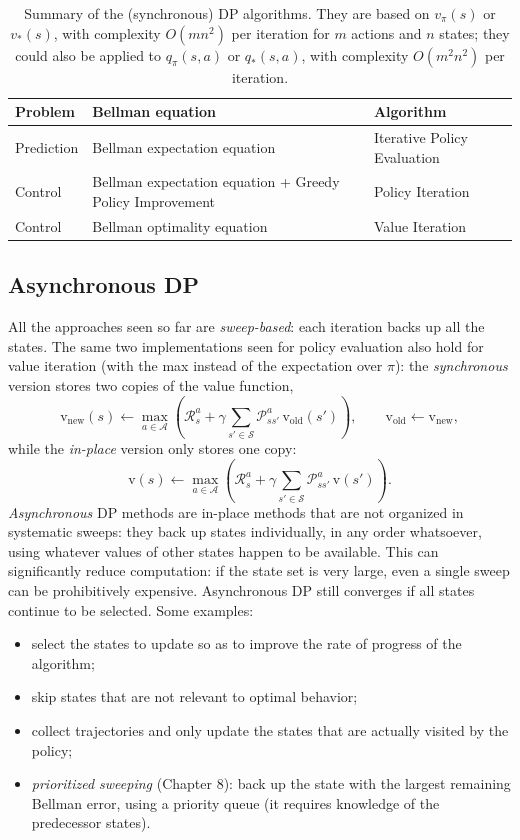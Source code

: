 \begin{table}[H]
\centering
\begin{tabular}{@{}l p{5.5cm} l@{}}
\toprule
\textbf{Problem} & \textbf{Bellman equation} & \textbf{Algorithm} \\
\midrule
Prediction & Bellman expectation equation & Iterative Policy Evaluation \\
Control    & Bellman expectation equation + Greedy Policy Improvement & Policy Iteration \\
Control    & Bellman optimality equation & Value Iteration \\
\bottomrule
\end{tabular}
\caption{Summary of the (synchronous) DP algorithms. They are based on $v_\pi(s)$ or $v_*(s)$, with complexity $O(mn^2)$ per iteration for $m$ actions and $n$ states; they could also be applied to $q_\pi(s,a)$ or $q_*(s,a)$, with complexity $O(m^2n^2)$ per iteration.}
\label{tab:dp-summary}
\end{table}

\subsection{Asynchronous DP}
All the approaches seen so far are \emph{sweep-based}: each iteration backs up all the states. The same two implementations seen for policy evaluation also hold for value iteration (with the max instead of the expectation over $\pi$): the \emph{synchronous} version stores two copies of the value function,
\[
  \mathrm{v}_{\text{new}}(s) \leftarrow \max_{a \in \mathcal{A}}
  \left( \mathcal{R}_s^a + \gamma \sum_{s' \in \mathcal{S}}
  \mathcal{P}_{ss'}^a \, \mathrm{v}_{\text{old}}(s') \right),
  \qquad
  \mathrm{v}_{\text{old}} \leftarrow \mathrm{v}_{\text{new}},
\]
while the \emph{in-place} version only stores one copy:
\[
  \mathrm{v}(s) \leftarrow \max_{a \in \mathcal{A}}
  \left( \mathcal{R}_s^a + \gamma \sum_{s' \in \mathcal{S}}
  \mathcal{P}_{ss'}^a \, \mathrm{v}(s') \right).
\]
\emph{Asynchronous} DP methods are in-place methods that are not organized in systematic sweeps: they back up states individually, in any order whatsoever, using whatever values of other states happen to be available. This can significantly reduce computation: if the state set is very large, even a single sweep can be prohibitively expensive. Asynchronous DP still converges if all states continue to be selected. Some examples:
\begin{itemize}
    \item select the states to update so as to improve the rate of progress of the algorithm;
    \item skip states that are not relevant to optimal behavior;
    \item collect trajectories and only update the states that are actually visited by the policy;
    \item \emph{prioritized sweeping} (Chapter 8): back up the state with the largest remaining Bellman error, using a priority queue (it requires knowledge of the predecessor states).
\end{itemize}
